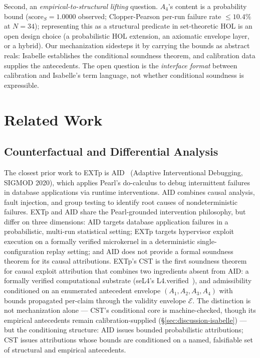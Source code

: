 \documentclass[conference]{IEEEtran}
\newcommand{\scoreS}{\text{score}_S}
\begin{document}
Second, an \emph{empirical-to-structural lifting} question. $A_4$'s
content is a probability bound ($\scoreS{=}1.0000$ observed;
Clopper-Pearson per-run failure rate $\leq 10.4\%$ at $N{=}34$);
representing this as a structural predicate in set-theoretic HOL is
an open design choice (a probabilistic HOL extension, an axiomatic
envelope layer, or a hybrid). Our mechanization sidesteps it by
carrying the bounds as abstract reals: Isabelle establishes the
conditional soundness theorem, and calibration data supplies the
antecedents. The open question is the \emph{interface format}
between calibration and Isabelle's term language, not whether
conditional soundness is expressible.

\section{Related Work}\label{sec:related}

\subsection{Counterfactual and Differential Analysis}

The closest prior work to EXTp is AID~\cite{fariha2020aid} (Adaptive
Interventional Debugging, SIGMOD 2020), which applies Pearl's
do-calculus to debug intermittent failures in database applications
via runtime interventions. AID combines causal analysis, fault
injection, and group testing to identify root causes of
nondeterministic failures. EXTp and AID share the Pearl-grounded
intervention philosophy, but differ on three dimensions: AID targets
database application failures in a probabilistic, multi-run
statistical setting; EXTp targets hypervisor exploit execution on a
formally verified microkernel in a deterministic single-configuration
replay setting; and AID does not provide a formal soundness theorem
for its causal attributions. EXTp's CST is the first soundness
theorem for causal exploit attribution that combines two
ingredients absent from AID: a formally verified computational
substrate (seL4's L4.verified~\cite{klein2014sel4}), and admissibility
conditioned on an enumerated antecedent envelope $(A_1, A_2, A_3, A_4)$
with bounds propagated per-claim through the validity envelope
$\mathcal{E}$. The distinction is not mechanization alone --- CST's
conditional core is machine-checked, though its empirical
antecedents remain calibration-supplied
(\S\ref{sec:discussion-isabelle}) --- but the conditioning structure:
AID issues bounded probabilistic attributions; CST issues
attributions whose bounds are conditioned on a named, falsifiable
set of structural and empirical antecedents.
\end{document}
